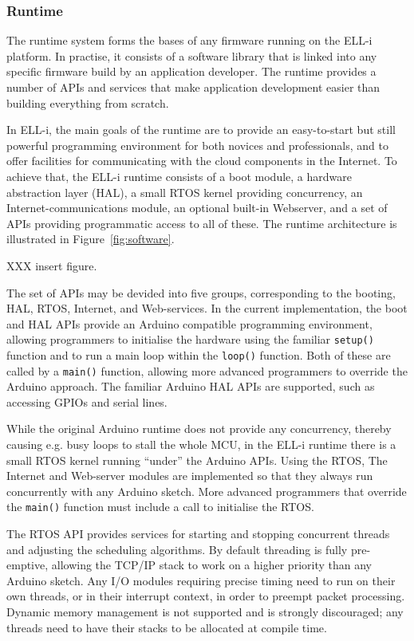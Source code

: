 \documentclass[draft,a4paper]{siamltex}
\begin{document}
\subsubsection{Runtime}

The runtime system forms the bases of any firmware running on the
ELL-i platform.  In practise, it consists of a software library that
is linked into any specific firmware build by an application
developer.  The runtime provides a number of APIs and services that make
application development easier than building everything from scratch.

In ELL-i, the main goals of the runtime are to provide an
easy-to-start but still powerful programming environment for both
novices and professionals, and to offer facilities for communicating
with the cloud components in the Internet.  To achieve that, the ELL-i
runtime consists of a boot module, a hardware abstraction layer (HAL),
a small RTOS kernel providing concurrency, an Internet-communications
module, an optional built-in Webserver, and a set of APIs providing
programmatic access to all of these.  The runtime architecture is
illustrated in Figure~\ref{fig:software}.

XXX insert figure.

The set of APIs may be devided into five groups, corresponding to the
booting, HAL, RTOS, Internet, and Web-services.  In the current
implementation, the boot and HAL APIs provide an Arduino compatible
programming environment, allowing programmers to initialise the
hardware using the familiar \hbox{\tt setup()} function and to run a
main loop within the \hbox{\tt loop()} function.  Both of these are
called by a \hbox{\tt main()} function, allowing more advanced
programmers to override the Arduino approach.  The familiar Arduino
HAL APIs are supported, such as accessing GPIOs and serial lines.

While the original Arduino runtime does not provide any concurrency,
thereby causing e.g. busy loops to stall the whole MCU, in the ELL-i
runtime there is a small RTOS kernel running ``under'' the Arduino
APIs.  Using the RTOS, The Internet and Web-server modules are
implemented so that they always run concurrently with any Arduino
sketch.  More advanced programmers that override the \hbox{\tt main()}
function must include a call to initialise the RTOS.

The RTOS API provides services for starting and stopping concurrent
threads and adjusting the scheduling algorithms.  By default threading
is fully pre-emptive, allowing the TCP/IP stack to work on a higher
priority than any Arduino sketch.  Any I/O modules requiring precise
timing need to run on their own threads, or in their interrupt
context, in order to preempt packet processing.  Dynamic memory
management is not supported and is strongly discouraged; any threads
need to have their stacks to be allocated at compile time.
\end{document}
